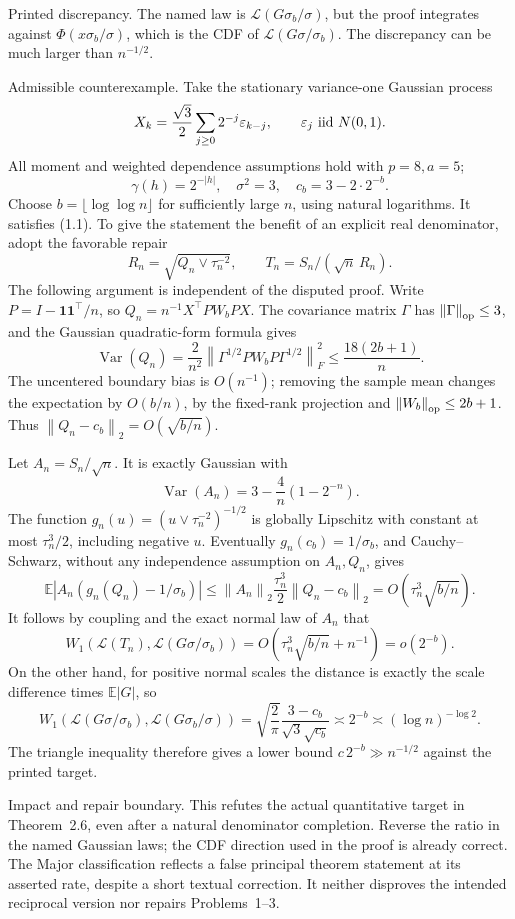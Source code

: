 \documentclass[10pt]{article}
\begin{document}
Printed discrepancy. The named law is \(\mathcal L(G\sigma_b/\sigma)\), but the proof integrates against \(\Phi(x\sigma_b/\sigma)\), which is the CDF of \(\mathcal L(G\sigma/\sigma_b)\). The discrepancy can be much larger than \(n^{-1/2}\).\par
Admissible counterexample. Take the stationary variance-one Gaussian process \[X_k=\frac{\sqrt3}{2}\sum_{j\ge0}2^{-j}\varepsilon_{k-j},
\qquad \varepsilon_j\ {\rm iid}\ N(0,1).\] All moment and weighted dependence assumptions hold with \(p=8,a=5\); \[\gamma(h)=2^{-|h|},\quad \sigma^2=3,\quad
c_b=3-2\cdot2^{-b}.\] Choose \(b=\lfloor\log\log n\rfloor\) for sufficiently large \(n\), using natural logarithms. It satisfies (1.1). To give the statement the benefit of an explicit real denominator, adopt the favorable repair \[R_n=\sqrt{Q_n\vee\tau_n^{-2}},\qquad T_n=S_n/(\sqrt n\,R_n).\] The following argument is independent of the disputed proof. Write \(P=I-\mathbf1\mathbf1^\top/n\), so \(Q_n=n^{-1}X^\top PW_bPX\). The covariance matrix \(\Gamma\) has \(\left\|\Gamma\right\|_{\rm op}\le3\), and the Gaussian quadratic-form formula gives \[\operatorname{Var}(Q_n)
=\frac2{n^2}\left\|\Gamma^{1/2}PW_bP\Gamma^{1/2}\right\|_F^2
\le\frac{18(2b+1)}n .\] The uncentered boundary bias is \(O(n^{-1})\); removing the sample mean changes the expectation by \(O(b/n)\), by the fixed-rank projection and \(\left\|W_b\right\|_{\rm op}\le2b+1\). Thus \(\left\|Q_n-c_b\right\|_2=O(\sqrt{b/n})\).\par
Let \(A_n=S_n/\sqrt n\). It is exactly Gaussian with \[\operatorname{Var}(A_n)=3-\frac4n(1-2^{-n}).\] The function \(g_n(u)=(u\vee\tau_n^{-2})^{-1/2}\) is globally Lipschitz with constant at most \(\tau_n^3/2\), including negative \(u\). Eventually \(g_n(c_b)=1/\sigma_b\), and Cauchy–Schwarz, without any independence assumption on \(A_n,Q_n\), gives \[\mathbb E|A_n(g_n(Q_n)-1/\sigma_b)|
\le\left\|A_n\right\|_2\frac{\tau_n^3}2\left\|Q_n-c_b\right\|_2
=O(\tau_n^3\sqrt{b/n}).\] It follows by coupling and the exact normal law of \(A_n\) that \[W_1(\mathcal L(T_n),\mathcal L(G\sigma/\sigma_b))
=O(\tau_n^3\sqrt{b/n}+n^{-1})=o(2^{-b}).\] On the other hand, for positive normal scales the distance is exactly the scale difference times \(\mathbb E|G|\), so \[W_1(\mathcal L(G\sigma/\sigma_b),\mathcal L(G\sigma_b/\sigma))
=\sqrt{\frac2\pi}\frac{3-c_b}{\sqrt3\sqrt{c_b}}
\asymp2^{-b}\asymp(\log n)^{-\log2}.\] The triangle inequality therefore gives a lower bound \(c\,2^{-b}\gg n^{-1/2}\) against the printed target.\par
Impact and repair boundary. This refutes the actual quantitative target in Theorem 2.6, even after a natural denominator completion. Reverse the ratio in the named Gaussian laws; the CDF direction used in the proof is already correct. The Major classification reflects a false principal theorem statement at its asserted rate, despite a short textual correction. It neither disproves the intended reciprocal version nor repairs Problems 1–3.\par
\end{document}
